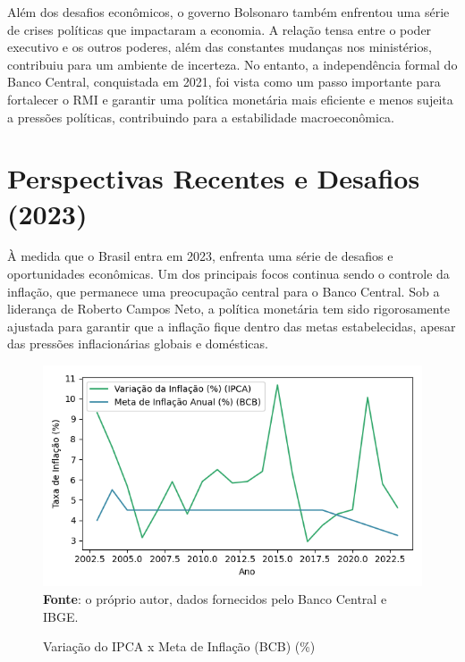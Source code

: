 \documentclass[12pt,oneside,a4paper,chapter=TITLE,english,brazil,sumario=abnt-6027-2012]{abntex2}
\begin{document}
Além dos desafios econômicos, o governo Bolsonaro também enfrentou uma série de crises políticas que impactaram a economia. A relação tensa entre o poder executivo e os outros poderes, além das constantes mudanças nos ministérios, contribuiu para um ambiente de incerteza. No entanto, a independência formal do Banco Central, conquistada em 2021, foi vista como um passo importante para fortalecer o RMI e garantir uma política monetária mais eficiente e menos sujeita a pressões políticas, contribuindo para a estabilidade macroeconômica.

\section{Perspectivas Recentes e Desafios (2023)}

À medida que o Brasil entra em 2023, enfrenta uma série de desafios e oportunidades econômicas. Um dos principais focos continua sendo o controle da inflação, que permanece uma preocupação central para o Banco Central. Sob a liderança de Roberto Campos Neto, a política monetária tem sido rigorosamente ajustada para garantir que a inflação fique dentro das metas estabelecidas, apesar das pressões inflacionárias globais e domésticas.

\begin{figure}[H]
	
	\caption{Variação do IPCA x Meta de Inflação (BCB) (\%)}
	
	\includegraphics[]{fig/ibge_ipca_bcb_meta_99_23_t.png}\\
	
	\footnotesize \textbf{Fonte}: o próprio autor, dados fornecidos pelo Banco Central e IBGE.
	
\end{figure}
\end{document}
